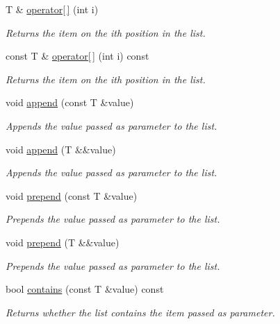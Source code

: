 \begin{DoxyCompactItemize}
T \& \mbox{\hyperlink{class_a_list_ae14e6bff6596b91b77a40b0d03777e66}{operator\mbox{[}$\,$\mbox{]}}} (int i)
\begin{DoxyCompactList}\small\item\em Returns the item on the ith position in the list. \end{DoxyCompactList}\item 
const T \& \mbox{\hyperlink{class_a_list_ab7dd2c5a1bef44beabc15070eb14c050}{operator\mbox{[}$\,$\mbox{]}}} (int i) const
\begin{DoxyCompactList}\small\item\em Returns the item on the ith position in the list. \end{DoxyCompactList}\item 
void \mbox{\hyperlink{class_a_list_a210e9e0657a0f4541247a290d21b6d23}{append}} (const T \&value)
\begin{DoxyCompactList}\small\item\em Appends the value passed as parameter to the list. \end{DoxyCompactList}\item 
void \mbox{\hyperlink{class_a_list_ac8e33a3962d74310ebafc8d99be5437a}{append}} (T \&\&value)
\begin{DoxyCompactList}\small\item\em Appends the value passed as parameter to the list. \end{DoxyCompactList}\item 
void \mbox{\hyperlink{class_a_list_a35838eb653492086769df4c444e08281}{prepend}} (const T \&value)
\begin{DoxyCompactList}\small\item\em Prepends the value passed as parameter to the list. \end{DoxyCompactList}\item 
void \mbox{\hyperlink{class_a_list_a6cae264346546d9e6cc68252a2e0b3d5}{prepend}} (T \&\&value)
\begin{DoxyCompactList}\small\item\em Prepends the value passed as parameter to the list. \end{DoxyCompactList}\item 
bool \mbox{\hyperlink{class_a_list_ab3db4e8f60d5abf4e7a12d928fb244a0}{contains}} (const T \&value) const
\begin{DoxyCompactList}\small\item\em Returns whether the list contains the item passed as parameter. \end{DoxyCompactList}\item 

\end{DoxyCompactItemize}
